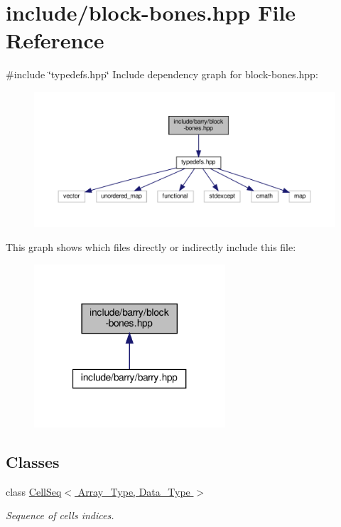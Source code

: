 \hypertarget{block-bones_8hpp}{}\section{include/block-\/bones.hpp File Reference}
\label{block-bones_8hpp}
{\ttfamily \#include \char`\"{}typedefs.\+hpp\char`\"{}}\newline
Include dependency graph for block-\/bones.hpp\+:\nopagebreak
\begin{figure}[H]
\begin{center}
\leavevmode
\includegraphics[width=350pt]{block-bones_8hpp__incl}
\end{center}
\end{figure}
This graph shows which files directly or indirectly include this file\+:\nopagebreak
\begin{figure}[H]
\begin{center}
\leavevmode
\includegraphics[width=202pt]{block-bones_8hpp__dep__incl}
\end{center}
\end{figure}
\subsection*{Classes}
\begin{DoxyCompactItemize}
\item 
class \hyperlink{class_cell_seq}{Cell\+Seq$<$ Array\+\_\+\+Type, Data\+\_\+\+Type $>$}
\begin{DoxyCompactList}\small\item\em Sequence of cells indices. \end{DoxyCompactList}\end{DoxyCompactItemize}
